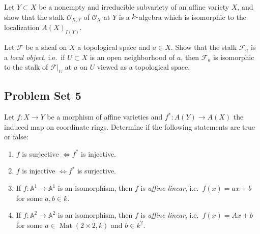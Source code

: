 \begin{exercise}

Let \(Y\subset X\) be a nonempty and irreducible subvariety of an affine
variety \(X\), and show that the stalk \({\mathcal{O}}_{X, Y}\) of
\({\mathcal{O}}_X\) at \(Y\) is a \(k{\hbox{-}}\)algebra which is
isomorphic to the localization \(A(X)_{I(Y)}\).

\end{exercise}

\begin{exercise}[Gathmann 3.24]

Let \(\mathcal{F}\) be a sheaf on \(X\) a topological space and
\(a\in X\). Show that the stalk \(\mathcal{F}_a\) is a \emph{local
object}, i.e.~if \(U\subset X\) is an open neighborhood of \(a\), then
\(\mathcal{F}_a\) is isomorphic to the stalk of
\({ \left.{{ \mathcal{F} }} \right|_{{U}} }\) at \(a\) on \(U\) viewed
as a topological space.

\end{exercise}

\hypertarget{problem-set-5}{%
\subsection{Problem Set 5}\label{problem-set-5}}

\begin{exercise}[Gathmann 4.13]

Let \(f:X\to Y\) be a morphism of affine varieties and
\(f^*: A(Y) \to A(X)\) the induced map on coordinate rings. Determine if
the following statements are true or false:

\begin{enumerate}
\def\labelenumi{\alph{enumi}.}
\item
  \(f\) is surjective \(\iff f^*\) is injective.
\item
  \(f\) is injective \(\iff f^*\) is surjective.
\item
  If \(f:{\mathbb{A}}^1\to{\mathbb{A}}^1\) is an isomorphism, then \(f\)
  is \emph{affine linear}, i.e.~\(f(x) = ax+b\) for some \(a, b\in k\).
\item
  If \(f:{\mathbb{A}}^2\to{\mathbb{A}}^2\) is an isomorphism, then \(f\)
  is \emph{affine linear}, i.e.~\(f(x) = Ax+b\) for some
  \(a \in \operatorname{Mat}(2\times 2, k)\) and \(b\in k^2\).
\end{enumerate}

\end{exercise}

